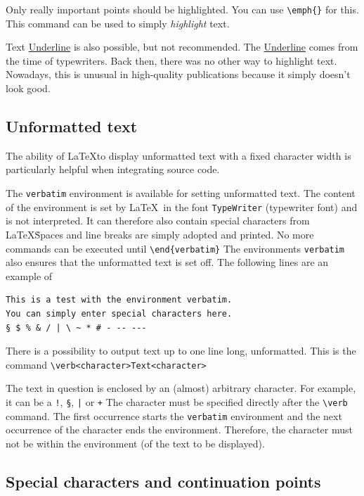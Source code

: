 \documentclass{llncs}
\begin{document}
Only really important points should be highlighted. You can use \verb!\emph{}! for this. This command can be used to simply \emph{highlight} text.

Text \underline{Underline} is also possible, but not recommended. The \underline{Underline} comes from the time of typewriters. Back then, there was no other way to highlight text. Nowadays, this is unusual in high-quality publications because it simply doesn't look good.

\subsection{Unformatted text}

The ability of \LaTeX to display unformatted text with a fixed character width is particularly helpful when integrating source code.

The \texttt{verbatim} environment is available for setting unformatted text. The content of the environment is set by \LaTeX\ in the font \texttt{TypeWriter} (typewriter font) and is not interpreted. It can therefore also contain special characters from \LaTeX\. Spaces and line breaks are simply adopted and printed. No more commands can be executed until \verb!\end{verbatim}! The environments \texttt{verbatim} also ensures that the unformatted text is set off. The following lines are an example of 

\begin{verbatim}
This is a test with the environment verbatim.
You can simply enter special characters here.
§ $ % & / | \ ~ * # - -- ---
\end{verbatim}

There is a possibility to output text up to one line long, unformatted. This is the command \verb!\verb<character>Text<character>!

The text in question is enclosed by an (almost) arbitrary character. For example, it can be a \verb+!+, \verb!§!, \verb!|! or \verb!+! The character must be specified directly after the \verb!\verb! command. The first occurrence starts the \verb!verbatim! environment and the next occurrence of the character ends the environment. Therefore, the character must not be within the environment (of the text to be displayed).

\subsection{Special characters and continuation points}
\end{document}

